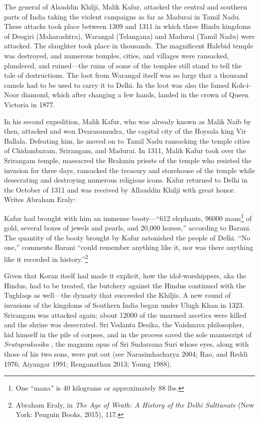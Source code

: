 The general of Alauddin Khilji, Malik Kafur, attacked the central and southern parts of India taking the violent campaigns as far as Madurai in Tamil Nadu. These attacks took place between 1309 and 1311 in which three Hindu kingdoms of Deogiri (Maharashtra), Warangal (Telangana) and Madurai (Tamil Nadu) were attacked. The slaughter took place in thousands. The magnificent Halebid temple was destroyed, and numerous temples, cities, and villages were ransacked, plundered, and ruined—the ruins of some of the temples still stand to tell the tale of destructions. The loot from Warangal itself was so large that a thousand camels had to be used to carry it to Delhi. In the loot was also the famed Koh-i-Noor diamond, which after changing a few hands, landed in the crown of Queen Victoria in 1877.

In his second expedition, Malik Kafur, who was already known as Malik Naib by then, attacked and won Dvarasamudra, the capital city of the Hoysala king Vir Ballala. Defeating him, he moved on to Tamil Nadu ransacking the temple cities of Chidambaram, Srirangam, and Madurai. In 1311, Malik Kafur took over the Srirangam temple, massacred the Brahmin priests of the temple who resisted the invasion for three days, ransacked the treasury and storehouse of the temple while desecrating and destroying numerous religious icons. Kafur returned to Delhi in the October of 1311 and was received by Allauddin Khilji with great honor. Writes Abraham Eraly:

Kafur had brought with him an immense booty—“612 elephants, 96000 mans\footnote{One “mana” is 40 kilograms or approximately 88 lbs.} of gold, several boxes of jewels and pearls, and 20,000 horses,” according to Barani. The quantity of the booty brought by Kafur astonished the people of Delhi. “No one,” comments Barani “could remember anything like it, nor was there anything like it recorded in history.”\footnote{Abraham Eraly, in \textit{The Age of Wrath: A History of the Delhi Sulttanate} (New York: Penguin Books, 2015), 117.}

Given that Koran itself had made it explicit, how the idol-worshippers, aka the Hindus, had to be treated, the butchery against the Hindus continued with the Tughlaqs as well—the dynasty that succeeded the Khiljis. A new round of invasions of the kingdoms of Southern India began under Ulugh Khan in 1323. Srirangam was attacked again; about 12000 of the unarmed ascetics were killed and the shrine was desecrated. Sri Vedanta Desika, the Vaishnava philosopher, hid himself in the pile of corpses, and in the process saved the sole manuscript of \textit{Srutaprakasika} , the magnum opus of Sri Sudarsana Suri whose eyes, along with those of his two sons, were put out (see Narasimhacharya 2004; Rao, and Reddi 1976; Aiyangar 1991; Renganathan 2013; Young 1988). 

